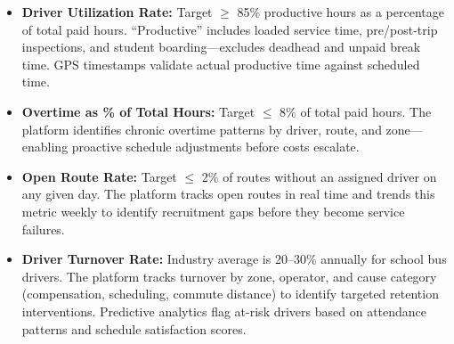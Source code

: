 \begin{description}[style=nextline, leftmargin=0.5cm]
    \item[\faIcon{chart-pie} \textbf{Key Metrics:}]
    \begin{itemize}
        \item \textbf{Driver Utilization Rate:} Target $\geq$ 85\% productive hours as a percentage of total paid hours. ``Productive'' includes loaded service time, pre/post-trip inspections, and student boarding---excludes deadhead and unpaid break time. GPS timestamps validate actual productive time against scheduled time.
        \item \textbf{Overtime as \% of Total Hours:} Target $\leq$ 8\% of total paid hours. The platform identifies chronic overtime patterns by driver, route, and zone---enabling proactive schedule adjustments before costs escalate.
        \item \textbf{Open Route Rate:} Target $\leq$ 2\% of routes without an assigned driver on any given day. The platform tracks open routes in real time and trends this metric weekly to identify recruitment gaps before they become service failures.
        \item \textbf{Driver Turnover Rate:} Industry average is 20--30\% annually for school bus drivers. The platform tracks turnover by zone, operator, and cause category (compensation, scheduling, commute distance) to identify targeted retention interventions. Predictive analytics flag at-risk drivers based on attendance patterns and schedule satisfaction scores.
    \end{itemize}
\end{description}
